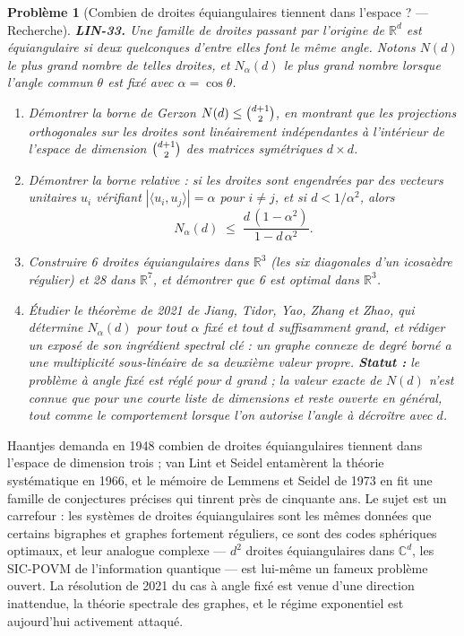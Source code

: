 \documentclass[11pt]{article}
\newtheorem{problem}{Problème}
\begin{document}
\bigskip

\begin{problem}[{Combien de droites équiangulaires tiennent dans l'espace ? --- Recherche}]
\textbf{LIN-33.} Une famille de droites passant par l'origine de $\mathbb{R}^d$ est
\textit{équiangulaire} si deux quelconques d'entre elles font le même angle. Notons $N(d)$ le plus
grand nombre de telles droites, et $N_\alpha(d)$ le plus grand nombre lorsque l'angle commun
$\theta$ est fixé avec $\alpha = \cos\theta$.
\begin{enumerate}
\item[(i)] Démontrer la borne de Gerzon $N(d) \le \tbinom{d+1}{2}$, en montrant que les projections
orthogonales sur les droites sont linéairement indépendantes à l'intérieur de l'espace de dimension
$\tbinom{d+1}{2}$ des matrices symétriques $d \times d$.
\item[(ii)] Démontrer la borne relative : si les droites sont engendrées par des vecteurs unitaires $u_i$
vérifiant $|\langle u_i, u_j \rangle| = \alpha$ pour $i \ne j$, et si $d < 1/\alpha^2$, alors
\[ N_\alpha(d) \;\le\; \frac{d\,(1 - \alpha^2)}{1 - d\,\alpha^2}. \]
\item[(iii)] Construire 6 droites équiangulaires dans $\mathbb{R}^3$ (les six diagonales d'un icosaèdre
régulier) et 28 dans $\mathbb{R}^7$, et démontrer que 6 est optimal dans $\mathbb{R}^3$.
\item[(iv)] Étudier le théorème de 2021 de Jiang, Tidor, Yao, Zhang et Zhao, qui détermine $N_\alpha(d)$
pour tout $\alpha$ fixé et tout $d$ suffisamment grand, et rédiger un exposé de son ingrédient
spectral clé : un graphe connexe de degré borné a une multiplicité sous-linéaire de sa deuxième valeur
propre. \textbf{Statut :} le problème à angle fixé est réglé pour $d$ grand ; la valeur exacte de
$N(d)$ n'est connue que pour une courte liste de dimensions et reste ouverte en général, tout comme
le comportement lorsque l'on autorise l'angle à décroître avec $d$.
\end{enumerate}

\end{problem}

\noindent Haantjes demanda en 1948 combien de droites équiangulaires tiennent dans l'espace de
dimension trois ; van Lint et Seidel entamèrent la théorie systématique en 1966, et le mémoire de
Lemmens et Seidel de 1973 en fit une famille de conjectures précises qui tinrent près de cinquante
ans. Le sujet est un carrefour : les systèmes de droites équiangulaires sont les mêmes données que
certains bigraphes et graphes fortement réguliers, ce sont des codes sphériques optimaux, et leur
analogue complexe --- $d^2$ droites équiangulaires dans $\mathbb{C}^d$, les SIC-POVM de
l'information quantique --- est lui-même un fameux problème ouvert. La résolution de 2021 du cas à angle
fixé est venue d'une direction inattendue, la théorie spectrale des graphes, et le régime exponentiel
est aujourd'hui activement attaqué.
\end{document}
